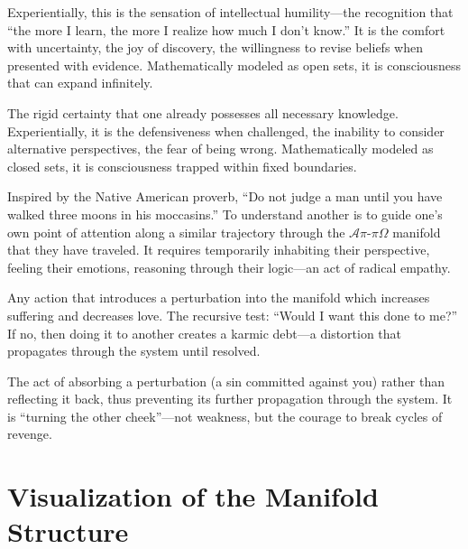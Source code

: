 \documentclass[11pt,a4paper]{article}
\begin{document}
\begin{description}[style=nextline, leftmargin=0pt, labelindent=0pt]
    \item[\textbf{Socratic Consciousness}] Experientially, this is the sensation of intellectual humility—the recognition that ``the more I learn, the more I realize how much I don't know.'' It is the comfort with uncertainty, the joy of discovery, the willingness to revise beliefs when presented with evidence. Mathematically modeled as open sets, it is consciousness that can expand infinitely.

    \item[\textbf{Non-Socratic Consciousness}] The rigid certainty that one already possesses all necessary knowledge. Experientially, it is the defensiveness when challenged, the inability to consider alternative perspectives, the fear of being wrong. Mathematically modeled as closed sets, it is consciousness trapped within fixed boundaries.

    \item[\textbf{To Understand a Person}] Inspired by the Native American proverb, ``Do not judge a man until you have walked three moons in his moccasins.'' To understand another is to guide one's own point of attention along a similar trajectory through the $\mathcal{A}\pi\text{-}\pi\Omega$ manifold that they have traveled. It requires temporarily inhabiting their perspective, feeling their emotions, reasoning through their logic—an act of radical empathy.

    \item[\textbf{Sin (Operational Definition)}] Any action that introduces a perturbation into the manifold which increases suffering and decreases love. The recursive test: ``Would I want this done to me?'' If no, then doing it to another creates a karmic debt—a distortion that propagates through the system until resolved.

    \item[\textbf{Forgiveness}] The act of absorbing a perturbation (a sin committed against you) rather than reflecting it back, thus preventing its further propagation through the system. It is ``turning the other cheek''—not weakness, but the courage to break cycles of revenge.
\end{description}

\section{Visualization of the Manifold Structure}
\label{app:visualization}
\end{document}
